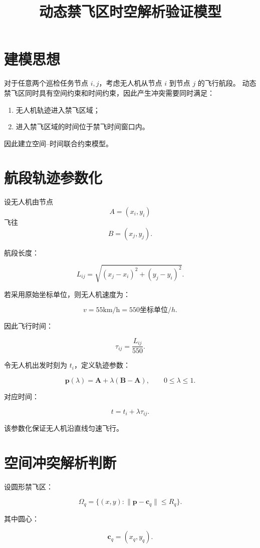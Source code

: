 \documentclass[UTF8]{ctexart}
\title{动态禁飞区时空解析验证模型}
\author{}
\date{}
\begin{document}
\maketitle

\section{建模思想}

对于任意两个巡检任务节点 $i,j$，考虑无人机从节点 $i$ 到节点 $j$ 的飞行航段。
动态禁飞区同时具有空间约束和时间约束，因此产生冲突需要同时满足：

\begin{enumerate}
    \item 无人机轨迹进入禁飞区域；
    \item 进入禁飞区域的时间位于禁飞时间窗口内。
\end{enumerate}

因此建立空间--时间联合约束模型。

\section{航段轨迹参数化}

设无人机由节点
\[
A=(x_i,y_i)
\]
飞往
\[
B=(x_j,y_j).
\]

航段长度：

\[
L_{ij}=\sqrt{(x_j-x_i)^2+(y_j-y_i)^2}.
\]

若采用原始坐标单位，则无人机速度为：

\[
v=55\mathrm{km/h}=550\text{坐标单位}/h.
\]

因此飞行时间：

\[
\tau_{ij}=\frac{L_{ij}}{550}.
\]

令无人机出发时刻为 $t_i$，定义轨迹参数：

\[
\bm p(\lambda)=
\bm A+\lambda(\bm B-\bm A),
\qquad 0\leq\lambda\leq1 .
\]

对应时间：

\[
t=t_i+\lambda\tau_{ij}.
\]

该参数化保证无人机沿直线匀速飞行。

\section{空间冲突解析判断}

设圆形禁飞区：

\[
\Omega_q=
\{(x,y):\|\bm p-\bm c_q\|\leq R_q\}.
\]

其中圆心：

\[
\bm c_q=(x_q,y_q).
\]
\end{document}
